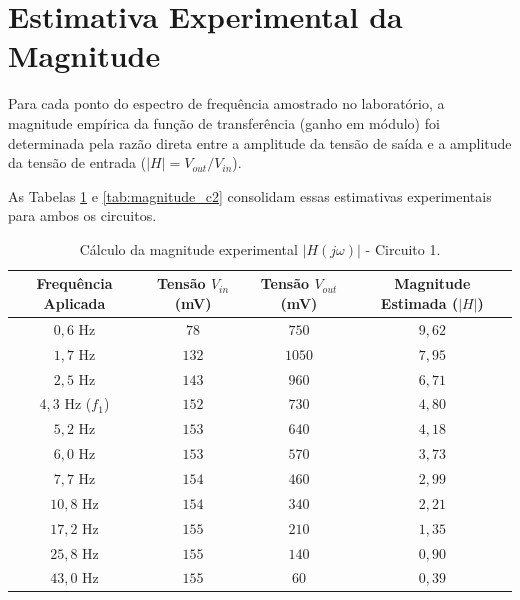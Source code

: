 \section{Estimativa Experimental da Magnitude}

Para cada ponto do espectro de frequência amostrado no laboratório, a magnitude empírica da função de transferência (ganho em módulo) foi determinada pela razão direta entre a amplitude da tensão de saída e a amplitude da tensão de entrada ($|H| = V_{out} / V_{in}$). 

As Tabelas \ref{tab:magnitude_c1} e \ref{tab:magnitude_c2} consolidam essas estimativas experimentais para ambos os circuitos.

\begin{table}[H]
	\centering
	\caption{Cálculo da magnitude experimental $|H(j\omega)|$ - Circuito 1.}
	\label{tab:magnitude_c1}
	\renewcommand{\arraystretch}{1.2}
	\begin{tabular}{cccc}
		\hline
		\textbf{Frequência Aplicada} & \textbf{Tensão $V_{in}$ (mV)} & \textbf{Tensão $V_{out}$ (mV)} & \textbf{Magnitude Estimada ($|H|$)} \\ \hline
		$0,6\text{ Hz}$ & $78$ & $750$ & $9,62$ \\
		$1,7\text{ Hz}$ & $132$ & $1050$ & $7,95$ \\
		$2,5\text{ Hz}$ & $143$ & $960$ & $6,71$ \\
		$4,3\text{ Hz}$ ($f_1$) & $152$ & $730$ & $4,80$ \\
		$5,2\text{ Hz}$ & $153$ & $640$ & $4,18$ \\
		$6,0\text{ Hz}$ & $153$ & $570$ & $3,73$ \\
		$7,7\text{ Hz}$ & $154$ & $460$ & $2,99$ \\
		$10,8\text{ Hz}$ & $154$ & $340$ & $2,21$ \\
		$17,2\text{ Hz}$ & $155$ & $210$ & $1,35$ \\
		$25,8\text{ Hz}$ & $155$ & $140$ & $0,90$ \\
		$43,0\text{ Hz}$ & $155$ & $60$ & $0,39$ \\ \hline
	\end{tabular}
\end{table}

